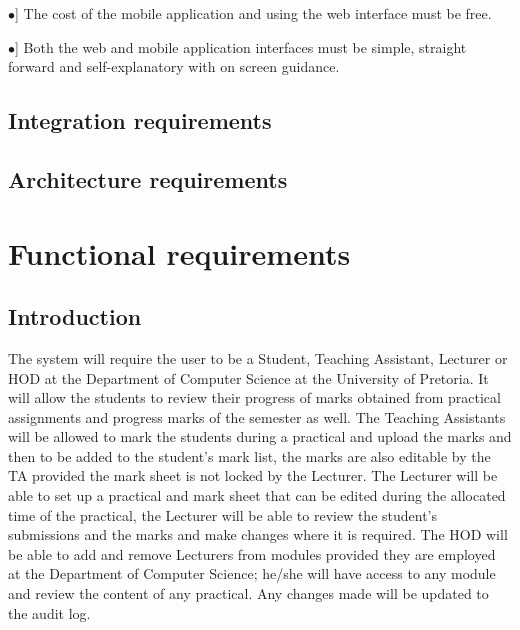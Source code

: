 \documentclass[12pt, a4paper]{scrartcl}
\newcommand{\tab}[1]{\hspace{.05\textwidth}\rlap{#1}}
\begin{document}
				\begin{description}
					\item \tab \textsc{\bf Cost}
					\begin{description}
						\item \tab [$\bullet$] The cost of the mobile application and using the web interface must be free.
					\end{description}
				\end{description}
				\begin{description}
					\item \tab \textsc{\bf Usability}
					\begin{description}
						\item \tab [$\bullet$] Both the web and mobile application interfaces must be simple, straight forward and self-explanatory with on screen guidance.
					\end{description}
				\end{description}
			\subsection{Integration requirements}
			\subsection{Architecture requirements}		
		\section{Functional requirements}
			\subsection{Introduction}
			The system will require the user to be a Student, Teaching Assistant, Lecturer or HOD at the Department of Computer Science at the University of Pretoria. It will allow the students to review their progress of marks obtained from practical assignments and progress marks of the semester as well. The Teaching Assistants will be allowed to mark the students during a practical and upload the marks and then to be added to the student’s mark list, the marks are also editable by the TA provided the mark sheet is not locked by the Lecturer. The Lecturer will be able to set up a practical and mark sheet that can be edited during the allocated time of the practical, the Lecturer will be able to review the student’s submissions and the marks and make changes where it is required. The HOD will be able to add and remove Lecturers from modules provided they are employed at the Department of Computer Science; he/she will have access to any module and review the content of any practical. Any changes made will be updated to the audit log.
\end{document}
